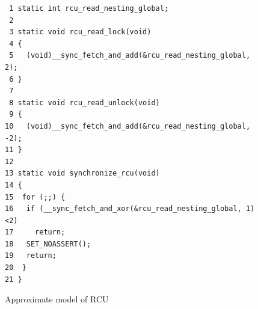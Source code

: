 \documentclass{svjour3}
\begin{document}

\begin{figure}[tb]
{ \scriptsize
\begin{verbatim}
 1 static int rcu_read_nesting_global;
 2 
 3 static void rcu_read_lock(void)
 4 {
 5   (void)__sync_fetch_and_add(&rcu_read_nesting_global, 2);
 6 }
 7 
 8 static void rcu_read_unlock(void)
 9 {
10   (void)__sync_fetch_and_add(&rcu_read_nesting_global, -2);
11 }
12 
13 static void synchronize_rcu(void)
14 {
15  for (;;) {
16   if (__sync_fetch_and_xor(&rcu_read_nesting_global, 1)<2)
17     return;
18   SET_NOASSERT();
19   return;
20  }
21 }
\end{verbatim}
}
\caption{Approximate model of RCU}
\label{fig:Approximate Model of RCU}
\end{figure}
\end{document}
